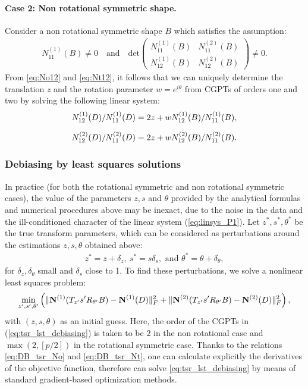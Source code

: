 \paragraph{Case 2: Non rotational symmetric shape.}
Consider a non rotational symmetric shape $B$ which satisfies the
assumption:
\begin{align}
  \label{eq:cond_P1}
 N_{11}^{(1)}(B) \neq 0 \quad \mbox{and} \quad  \mbox{det}
  \begin{pmatrix}
    N_{11}^{(1)}(B) & N_{11}^{(2)}(B) \\
    N_{12}^{(1)}(B) & N_{12}^{(2)}(B)
  \end{pmatrix} \neq 0.
\end{align}
From \eqref{eq:No12} and \eqref{eq:Nt12}, it follows that we can
uniquely determine the translation $z$ and the rotation parameter
$w= e^{i\theta}$ from CGPTs of orders one and two by solving the
following linear system:
\begin{align}
  \label{eq:linsys_P1}
  N_{12}^{(1)}(D)/N_{11}^{(1)}(D) &= 2z + w N_{12}^{(1)}(B)/N_{11}^{(1)}(B), \notag \\
  \nm
  N_{12}^{(2)}(D)/N_{11}^{(2)}(D) &= 2z + w N_{12}^{(2)}(B)/N_{11}^{(2)}(B).
\end{align}


\subsubsection{Debiasing by least squares solutions} \label{secdeb} In practice (for both the rotational symmetric and non rotational
symmetric cases), the value of the parameters $z, s$ and $\theta$
provided by the analytical formulas and numerical procedures above
may be inexact, due to the noise in the data and the
ill-conditioned character of the linear system
(\ref{eq:linsys_P1}). Let $z^*, s^*, \theta^*$ be the true
transform parameters, which can be considered as  perturbations
around the estimations $z, s, \theta$ obtained above:
\begin{align}
  z^*=z+\delta_z, \ s^*=s \delta_s, \mbox{ and } \theta^*=\theta+\delta_\theta , \label{eq:parameters_pertub}
\end{align}
for $\delta_z, \delta_\theta$ small and $\delta_s$ close to 1. To
find these perturbations, we solve a nonlinear least squares
problem:
\begin{align}
  \min_{z',s',\theta'}
  \left(\mathopen\| \mathbf{N}^{(1)}(T_{z'}s'R_{\theta'} B) -
      \mathbf{N}^{(1)}(D) \mathclose\|_F^2 +
    \mathopen\| \mathbf{N}^{(2)}(T_{z'}s'R_{\theta'} B) - \mathbf{N}^{(2)}(
      D) \mathclose\|_F^2\right) , \label{eq:tsr_lst_debiasing}
\end{align}
with $(z,s,\theta)$ as an initial guess. Here, the order of the
CGPTs in (\ref{eq:tsr_lst_debiasing}) is taken to be $2$ in the
non rotational case and $\max(2, [p/2])$ in the rotational
symmetric case. Thanks to the relations \eqref{eq:DB_tsr_No} and
\eqref{eq:DB_tsr_Nt}, one can calculate explicitly the derivatives
of the objective function, therefore can solve
\eqref{eq:tsr_lst_debiasing} by means of standard gradient-based
optimization methods.

